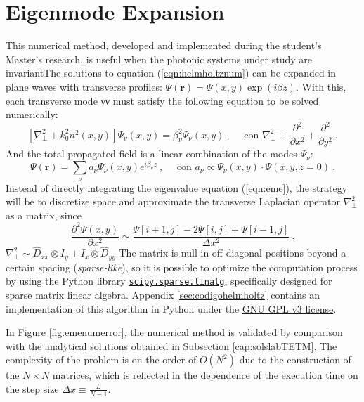 \section{Eigenmode Expansion \label{cap:eme}}
This numerical method, developed and implemented during the student's Master's research, is useful when the photonic systems under study are invariantThe solutions to equation (\ref{eqn:helmholtznum}) can be expanded in plane waves with transverse profiles: $\Psi(\textbf{r}) = \Psi(x,y) \exp({i\beta z})$. With this, each transverse mode νν must satisfy the following equation to be solved numerically:
\begin{equation}
	\left[\nabla_\perp^2 + k_0^2 n^2(x,y)\right]\Psi_\nu(x,y) = \beta_\nu^2\Psi_\nu(x,y) \ , \quad\text{ con } \nabla_\perp^2 \equiv \frac{\partial^2}{\partial x^2} + \frac{\partial^2}{\partial y^2} \ .
	\label{eqn:eme}
\end{equation}
And the total propagated field is a linear combination of the modes $\Psi_\nu$: 
\begin{equation}
	\Psi(\textbf{r}) = \sum_\nu a_\nu \Psi_\nu(x,y) e^{i\beta_\nu z} \ , \quad\text{ con } a_\nu \propto \Psi_\nu(x,y) \cdot \Psi(x, y, z=0) \ . \label{eqn:emedin}
\end{equation}
Instead of directly integrating the eigenvalue equation (\ref{eqn:eme}), the strategy will be to discretize space and approximate the transverse Laplacian operator $\nabla_\perp^2$ as a matrix, since $$\frac{\partial^2 \Psi(x,y)}{\partial x^2} \sim \frac{\Psi[i+1,j]-2\Psi[i,j]+\Psi[i-1,j]}{\Delta x ^2}  \ .
$$
$\nabla^2_\perp \sim \hat{D}_{xx} \otimes I_y + I_x \otimes \hat{D}_{yy}$
The matrix is null in off-diagonal positions beyond a certain spacing (\textit{sparse-like}), so it is possible to optimize the computation process by using the Python library \href{https://docs.scipy.org/doc/scipy/reference/sparse.linalg.html}{\color{magenta}\texttt{scipy.sparse.linalg}}, specifically designed for sparse matrix linear algebra. Appendix \ref{sec:codigohelmholtz} contains an implementation of this algorithm in Python under the \href{https://www.gnu.org/licenses/gpl-3.0.html}{\color{magenta}GNU GPL v3 license}.

In Figure \ref{fig:emenumerror}, the numerical method is validated by comparison with the analytical solutions obtained in Subsection \ref{cap:solslabTETM}. The complexity of the problem is on the order of $O(N^2)$ due to the construction of the $N\times N$ matrices, which is reflected in the dependence of the execution time on the step size $\Delta x \equiv \frac{L}{N-1}$.


